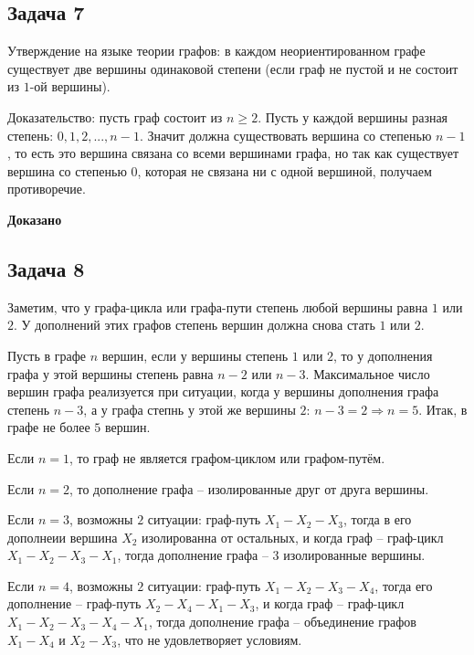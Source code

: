 \documentclass[a4paper,14pt]{article} %
\begin{document}
\begin{center}
\subsection{Задача 7}
\end{center}

Утверждение на языке теории графов: в каждом неориентированном графе существует две вершины одинаковой степени (если граф не пустой и не состоит из $1$-ой вершины).

Доказательство: пусть граф состоит из $n \geqslant 2$. Пусть у каждой вершины разная степень: $0, 1, 2, ..., n-1$. Значит должна существовать вершина со степенью $n-1$, то есть это вершина связана со всеми вершинами графа, но так как существует вершина со степенью $0$, которая не связана ни с одной вершиной, получаем противоречие.

\begin{flushright}
\begin{large}
\textbf {Доказано}
\end{large}
\end{flushright}

\newpage
\begin{center}
\subsection{Задача 8}
\end{center}

Заметим, что у графа-цикла или графа-пути степень любой вершины равна $1$ или $2$. У дополнений этих графов степень вершин должна снова стать $1$ или $2$.

Пусть в графе $n$ вершин, если у вершины степень $1$ или $2$, то у дополнения графа у этой вершины степень равна $n-2$ или $n-3$. Максимальное число вершин графа реализуется при ситуации, когда у вершины дополнения графа степень $n-3$, а у графа степнь у этой же вершины $2$: $n-3 = 2 \Rightarrow n= 5$. Итак, в графе не более $5$ вершин.

Если $n=1$, то граф не является графом-циклом или графом-путём.

Если $n=2$, то дополнение графа -- изолированные друг от друга вершины.

Если $n= 3$, возможны $2$ ситуации: граф-путь $X_1-X_2-X_3$, тогда в его дополнеии вершина $X_2$ изолированна от остальных, и когда граф -- граф-цикл $X_1-X_2-X_3-X_1$, тогда дополнение графа -- $3$ изолированные вершины.

Если $n= 4$, возможны $2$ ситуации: граф-путь $X_1-X_2-X_3-X_4$, тогда его дополнение -- граф-путь $X_2-X_4-X_1-X_3$, и когда граф -- граф-цикл $X_1-X_2-X_3-X_4-X_1$, тогда дополнение графа -- объединение графов $X_1-X_4$ и $X_2-X_3$, что не удовлетворяет условиям.
\end{document}
